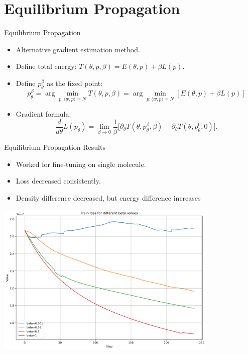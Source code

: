 \documentclass{beamer}
\begin{document}
\section{Equilibrium Propagation}
\begin{frame}{Equilibrium Propagation}
  \begin{itemize}
    \item Alternative gradient estimation method.
    \item Define total energy: $T(\theta, p, \beta) = E(\theta, p) + \beta L(p)$.
    \item Define $p_{\theta}^{\beta}$ as the fixed point:
    \[
      p_{\theta}^{\beta} = \arg\min_{p:\langle w,p \rangle = N} T(\theta, p, \beta) = \arg\min_{p:\langle w,p \rangle = N} [E(\theta, p) + \beta L(p)]
    \]
    \item Gradient formula:
    \[
      \frac{d}{d\theta} L(p_{\theta}) = \lim_{\beta \to 0} \frac{1}{\beta} \Big[ \partial_{\theta}T(\theta, p^{\beta}_{\theta}, \beta) - \partial_{\theta}T(\theta, p^{0}_{\theta}, 0) \Big].
    \]
  \end{itemize}
\end{frame}

\begin{frame}{Equilibrium Propagation Results}
  \begin{itemize}
    \item Worked for fine-tuning on single molecule.
    \item Loss decreased consistently.
    \item Density difference decreased, but energy difference increases
  \end{itemize}

\end{frame}

\begin{frame}
   \begin{center}
    \includegraphics[width=0.8\textwidth]{images/train_loss_betas.png} %
  \end{center}
\end{frame}
\end{document}
